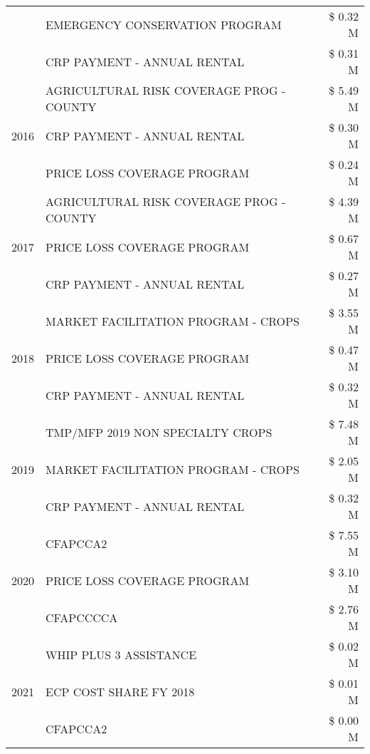 \begin{tabular}{llr}
 & EMERGENCY CONSERVATION PROGRAM & \$ 0.32 M \\
 & CRP PAYMENT - ANNUAL RENTAL & \$ 0.31 M \\
\cline{1-3}
\multirow[t]{3}{*}{2016} & AGRICULTURAL RISK COVERAGE PROG - COUNTY & \$ 5.49 M \\
 & CRP PAYMENT - ANNUAL RENTAL & \$ 0.30 M \\
 & PRICE LOSS COVERAGE PROGRAM & \$ 0.24 M \\
\cline{1-3}
\multirow[t]{3}{*}{2017} & AGRICULTURAL RISK COVERAGE PROG - COUNTY & \$ 4.39 M \\
 & PRICE LOSS COVERAGE PROGRAM & \$ 0.67 M \\
 & CRP PAYMENT - ANNUAL RENTAL & \$ 0.27 M \\
\cline{1-3}
\multirow[t]{3}{*}{2018} & MARKET FACILITATION PROGRAM - CROPS & \$ 3.55 M \\
 & PRICE LOSS COVERAGE PROGRAM & \$ 0.47 M \\
 & CRP PAYMENT - ANNUAL RENTAL & \$ 0.32 M \\
\cline{1-3}
\multirow[t]{3}{*}{2019} & TMP/MFP 2019 NON SPECIALTY CROPS & \$ 7.48 M \\
 & MARKET FACILITATION PROGRAM - CROPS & \$ 2.05 M \\
 & CRP PAYMENT - ANNUAL RENTAL & \$ 0.32 M \\
\cline{1-3}
\multirow[t]{3}{*}{2020} & CFAPCCA2 & \$ 7.55 M \\
 & PRICE LOSS COVERAGE PROGRAM & \$ 3.10 M \\
 & CFAPCCCCA & \$ 2.76 M \\
\cline{1-3}
\multirow[t]{3}{*}{2021} & WHIP PLUS 3 ASSISTANCE & \$ 0.02 M \\
 & ECP COST SHARE FY 2018 & \$ 0.01 M \\
 & CFAPCCA2 & \$ 0.00 M \\
\cline{1-3}
\bottomrule
\end{tabular}
